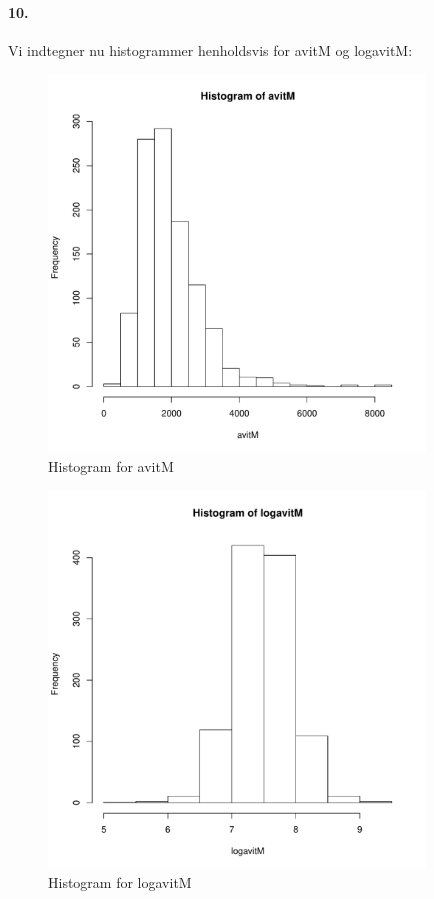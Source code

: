 \paragraph{10.}
Vi indtegner nu histogrammer henholdsvis for avitM og logavitM:

\begin{figure}[H]
\label{fig:anal4}
\begin{center}
\includegraphics[width=10cm]{graphs/analyse_1.pdf}
\caption{Histogram for avitM}
\end{center}
\end{figure}

\begin{figure}[H]
\label{fig:anal5}
\begin{center}
\includegraphics[width=10cm]{graphs/analyse_3.pdf}
\caption{Histogram for logavitM}
\end{center}
\end{figure}


